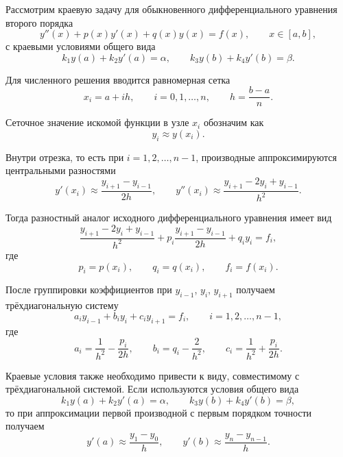 \documentclass[12pt,a4paper]{article}
\begin{document}
Рассмотрим краевую задачу для обыкновенного дифференциального уравнения второго порядка
\begin{equation*}
    y''(x) + p(x)y'(x) + q(x)y(x) = f(x), \qquad x \in [a,b],
\end{equation*}
с краевыми условиями общего вида
\begin{equation*}
    k_1 y(a) + k_2 y'(a) = \alpha, \qquad
    k_3 y(b) + k_4 y'(b) = \beta.
\end{equation*}

Для численного решения вводится равномерная сетка
\begin{equation*}
    x_i = a + ih, \qquad i = 0,1,\ldots,n, \qquad
    h = \frac{b-a}{n}.
\end{equation*}

Сеточное значение искомой функции в узле $x_i$ обозначим как
\begin{equation*}
    y_i \approx y(x_i).
\end{equation*}

Внутри отрезка, то есть при $i = 1,2,\ldots,n-1$, производные аппроксимируются центральными разностями
\begin{equation*}
    y'(x_i) \approx \frac{y_{i+1}-y_{i-1}}{2h},
    \qquad
    y''(x_i) \approx \frac{y_{i+1}-2y_i+y_{i-1}}{h^2}.
\end{equation*}

Тогда разностный аналог исходного дифференциального уравнения имеет вид
\begin{equation*}
    \frac{y_{i+1}-2y_i+y_{i-1}}{h^2}
    +
    p_i \frac{y_{i+1}-y_{i-1}}{2h}
    +
    q_i y_i
    =
    f_i,
\end{equation*}
где
\begin{equation*}
    p_i = p(x_i), \qquad q_i = q(x_i), \qquad f_i = f(x_i).
\end{equation*}

После группировки коэффициентов при $y_{i-1}$, $y_i$, $y_{i+1}$ получаем трёхдиагональную систему
\begin{equation*}
    a_i y_{i-1} + b_i y_i + c_i y_{i+1} = f_i,
    \qquad i = 1,2,\ldots,n-1,
\end{equation*}
где
\begin{equation*}
    a_i = \frac{1}{h^2} - \frac{p_i}{2h},
    \qquad
    b_i = q_i - \frac{2}{h^2},
    \qquad
    c_i = \frac{1}{h^2} + \frac{p_i}{2h}.
\end{equation*}

Краевые условия также необходимо привести к виду, совместимому с трёхдиагональной системой. Если используются условия общего вида
\begin{equation*}
    k_1 y(a) + k_2 y'(a) = \alpha,
    \qquad
    k_3 y(b) + k_4 y'(b) = \beta,
\end{equation*}
то при аппроксимации первой производной с первым порядком точности получаем
\begin{equation*}
    y'(a) \approx \frac{y_1-y_0}{h},
    \qquad
    y'(b) \approx \frac{y_n-y_{n-1}}{h}.
\end{equation*}
\end{document}
